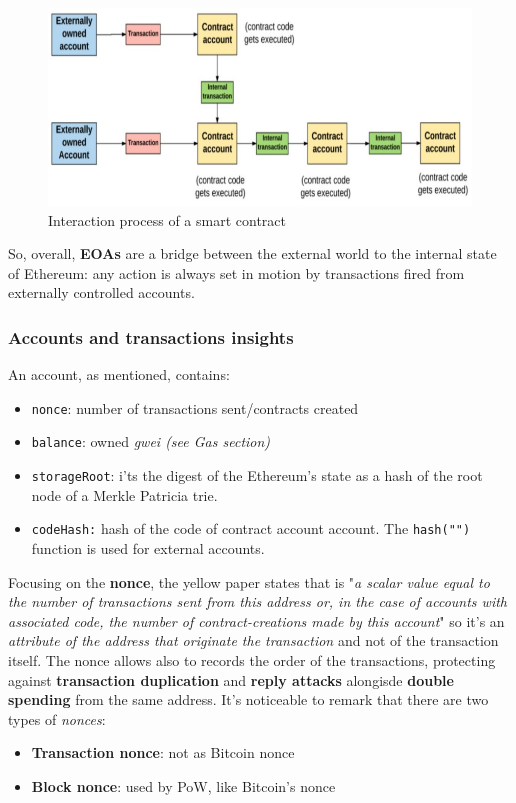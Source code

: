 \documentclass[10pt,a4paper]{report}
\begin{document}
	\begin{figure}[h]
		\centering
	\includegraphics[scale=0.50]{images/Pasted image 20230417115524.png}
	\caption{Interaction process of a smart contract}
	\label{interaction-contract-process}	
\end{figure}

So, overall, \textbf{EOAs} are a bridge between the external world to the internal state of Ethereum: any action is always set in motion by transactions fired from externally controlled accounts.
\subsubsection{Accounts and transactions insights}\label{sec:accounts-and-transactions-insights}
An account, as mentioned, contains:
\begin{itemize}
	\item 
	\texttt{nonce}: number of transactions sent/contracts created
	\item 
	\texttt{balance}: owned \textit{gwei (see Gas section)}
	\item 
	\texttt{storageRoot}: i'ts the digest of the Ethereum's state as a hash of the root node of a Merkle Patricia trie.
	\item 
	\texttt{codeHash:} hash of the code of contract account account. The \texttt{hash("")} function is used for external accounts.
	
\end{itemize}

Focusing on the \textbf{nonce}, the yellow paper states that is "\textit{a scalar value equal to the number of transactions sent from this address or, in the case of accounts with associated code, the number of contract-creations made by this account}" so it's an \textit{attribute of the address that originate the transaction} and not of the transaction itself.
The nonce allows also to records the order of the transactions, protecting against \textbf{transaction duplication} and \textbf{reply attacks} alongisde \textbf{double spending} from the same address.
It's noticeable to remark that there are two types of \textit{nonces}:
\begin{itemize}
	\item 
	\textbf{Transaction nonce}: not as Bitcoin nonce
	\item 
	\textbf{Block nonce}: used by PoW, like Bitcoin's nonce
\end{itemize}
\end{document}
